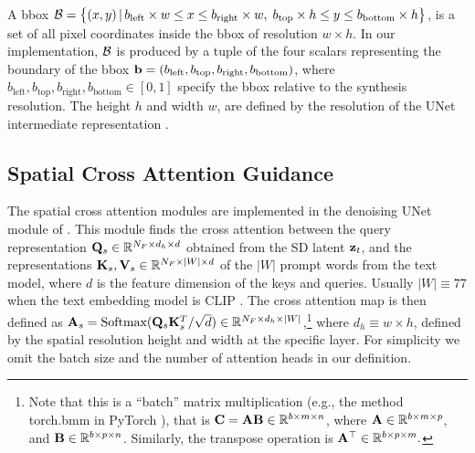 A bbox $\mathcal{B} = \bigl\{ (x, y) \,| \, b_{\text{left}} \times w \leq x \leq b_{\text{right}} \times w, \; b_{\text{top}} \times h \leq y \leq b_{\text{bottom}} \times h \bigl\}$, is a set of all pixel coordinates inside the bbox of resolution $w \times h$. In our implementation, $\mathcal{B}$ is produced by a tuple of the four scalars representing the boundary of the bbox $\mathbf{b} = (b_{\text{left}}, b_{\text{top}}, b_{\text{right}}, b_{\text{bottom}})$, where $b_{\text{left}}, b_{\text{top}}, b_{\text{right}}, b_{\text{bottom}} \in [0,1]$ specify the bbox relative to the synthesis resolution. The height $h$ and width $w$, are defined by the resolution of the UNet intermediate representation \cite{RombachStablediffusion21}.




\subsection{Spatial Cross Attention Guidance}
\label{ssec:sattn}

The spatial cross attention modules are implemented in the denoising UNet module of \cite{RombachStablediffusion21}. This module finds the cross attention between the query representation $\mathbf{Q}_s \in \mathbb{R}^{N_F \times d_{h} \times d}$ obtained from the SD latent $\mathbf{z}_t$, and the representations $\mathbf{K}_s, \mathbf{V}_s \in \mathbb{R}^{N_F \times |W| \times d}$ of the $|W|$ prompt words from the text model, where $d$ is the feature dimension of the keys and queries. Usually $|W| \equiv 77$  when the text embedding model is CLIP \cite{CLIP}. The cross attention map \cite{PromptToPrompt} is then defined as $\mathbf{A}_s = \text{Softmax}(\mathbf{Q}_s\mathbf{K}_s^{T}/\sqrt{d}) \in \mathbb{R}^{N_F \times d_h \times |W|}$,\footnote{Note that this is a ``batch'' matrix multiplication (e.g., the method torch.bmm in PyTorch \cite{paszke2019pytorch}), that is $\mathbf{C} = \mathbf{A} \mathbf{B} \in \mathbb{R}^{b \times m \times n}$, where $\mathbf{A} \in \mathbb{R}^{b \times m \times p}$, and $\mathbf{B} \in \mathbb{R}^{b \times p \times n}$. Similarly, the transpose operation is $\mathbf{A}^\top \in \mathbb{R}^{b \times p \times m}.$} where $d_h \equiv w \times h$, defined by the spatial resolution height and width at the specific layer. For simplicity we omit the batch size and the number of %
attention heads \cite{allyouneedattn} in our definition.

